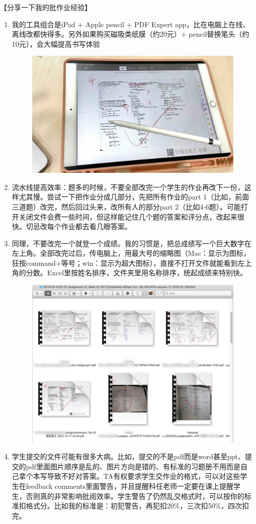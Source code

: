 \emptyline
【分享一下我的批作业经验】
\begin{enumerate}
    \item 我的工具组合是iPad + Apple pencil + PDF Expert app，比在电脑上在线、离线改都快得多。另外如果购买磁吸类纸膜（约20元）+ pencil替换笔头（约10元），会大幅提高书写体验
        \begin{figure}[H]
            \centering
            \includegraphics[width=0.5\columnwidth]{author-folder/Kai.Wu/marking_tools.jpg}
        \end{figure}
    \item 流水线提高效率：题多的时候，不要全部改完一个学生的作业再改下一份，这样尤其慢。尝试一下把作业分成几部分，先把所有作业的part 1（比如，前面三道题）改完，然后回过头来，改所有人的部分part 2（比如4-6题）。可能打开关闭文件会费一些时间，但这样能记住几个题的答案和评分点，改起来很快。切忌改每个作业都去看几眼答案。
    \item 同理，不要改完一个就登一个成绩。我的习惯是，把总成绩写一个巨大数字在左上角。全部改完过后，传电脑上，用最大号的缩略图（Mac：显示为图标，狂按command+等号；win：显示为超大图标），直接不打开文件就能看到左上角的分数。Excel里按姓名排序，文件夹里用名称排序，统起成绩来特别快。
        \begin{figure}[H]
            \centering
            \includegraphics[width=0.7\columnwidth]{author-folder/Kai.Wu/tongchengji.jpg}
        \end{figure}
    \item 学生提交的文件可能有很多大病。比如，提交的不是pdf而是word甚至ppt、提交的pdf里面图片顺序是乱的、图片方向是错的、有标准的习题册不用而是自己拿个本写导致不好对答案。TA有权要求学生交作业的格式，可以对这些学生在feedback comments里面警告，并且提醒科任老师一定要在课上提醒学生，否则真的非常影响批阅效率。学生警告了仍然乱交格式时，可以按你的标准扣格式分。比如我的标准是：初犯警告，再犯扣20\%，三次扣50\%，四次扣完。

\end{enumerate}
